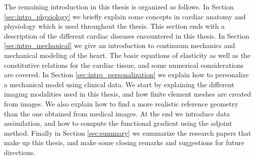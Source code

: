 The remaining introduction in this thesis is organized as follows. In
Section \ref{sec:intro_physiology} we briefly explain some concepts in
cardiac anatomy and physiology which is used throughout the
thesis. This section ends with a description of the different cardiac
diseases encountered in this thesis. In Section
\ref{sec:intro_mechanical} we give an introduction to continuum
mechanics and mechanical modeling of the heart. The basic equations of
elasticity as well as the constitutive relations for the cardiac
tissue, and some numerical considerations are covered. In Section 
\ref{sec:intro_personalization} we explain how to personalize a
mechanical model using clinical data. We start by explaining the
different imaging modalities used in this thesis, and how finite
element meshes are created from images. We also explain how to find a
more realistic reference geometry than the one obtained from medical
images. At the end we introduce data assimilation, and how to compute
the functional gradient using the adjoint method. Finally in Section
\ref{sec:summary} we summarize the research papers that make up this
thesis, and make some closing remarks and suggestions for future
directions. 

\newpage







% 

\newpage

\newpage

\newpage



\newpage






